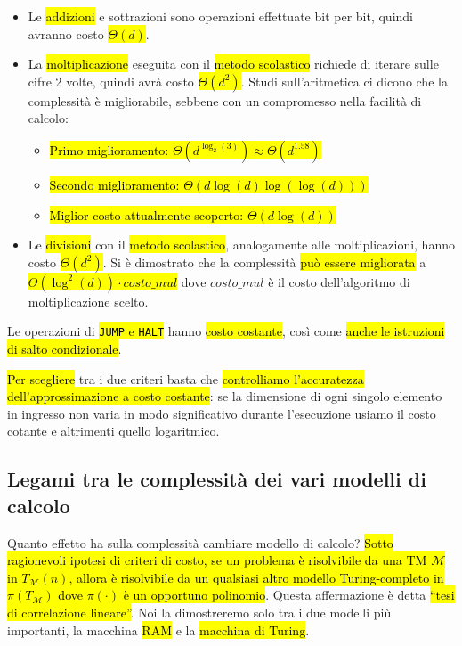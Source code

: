 \documentclass[a4paper,11pt,oneside]{article}
\theoremstyle{plain}
\theoremstyle{definition}
\theoremstyle{remark}
\begin{document}
\begin{itemize}
  \item Le \hl{addizioni} e sottrazioni sono operazioni effettuate bit per bit,
    quindi avranno costo \hl{$\Theta(d)$}.
  \item La \hl{moltiplicazione} eseguita con il \hl{metodo scolastico} richiede
    di iterare sulle cifre 2 volte, quindi avrà costo \hl{$\Theta(d^2)$}. Studi
    sull'aritmetica ci dicono che la complessità è migliorabile, sebbene con un
    compromesso nella facilità di calcolo:

    \begin{itemize}
      \item \hl{Primo miglioramento: $\Theta(d^{\log_2(3)}) \approx
        \Theta(d^{1.58})$}
      \item \hl{Secondo miglioramento: $\Theta(d\log(d)\log(\log(d)))$}
      \item \hl{Miglior costo attualmente scoperto: $\Theta(d\log(d))$}
    \end{itemize}

  \item Le \hl{divisioni} con il \hl{metodo scolastico}, analogamente alle
    moltiplicazioni, hanno costo \hl{$\Theta(d^2)$}. Si è dimostrato che la
    complessità \hl{può essere migliorata} a \hl{$\Theta(\log^2(d)) \cdot
    \mathit{costo\_mul}$} dove $\mathit{costo\_mul}$ è il costo dell'algoritmo
    di moltiplicazione scelto.
\end{itemize}

Le operazioni di \hl{\texttt{JUMP} e \texttt{HALT}} hanno \hl{costo costante},
così come \hl{anche le istruzioni di salto condizionale}.

\hl{Per scegliere} tra i due criteri basta che \hl{controlliamo l'accuratezza
dell'approssimazione a costo costante}: se la dimensione di ogni singolo
elemento in ingresso non varia in modo significativo durante l'esecuzione usiamo
il costo cotante e altrimenti quello logaritmico.

\subsection{Legami tra le complessità dei vari modelli di calcolo}

Quanto effetto ha sulla complessità cambiare modello di calcolo? \hl{Sotto
ragionevoli ipotesi di criteri di costo, se un problema è risolvibile da una TM
$\mathcal{M}$ in $T_\mathcal{M}(n)$, allora è risolvibile da un qualsiasi altro
modello Turing-completo in $\pi(T_\mathcal{M})$ dove $\pi(\cdot)$ è un opportuno
polinomio}. Questa affermazione è detta \hl{``tesi di correlazione lineare''}.
Noi la dimostreremo solo tra i due modelli più importanti, la macchina \hl{RAM}
e la \hl{macchina di Turing}.
\end{document}
